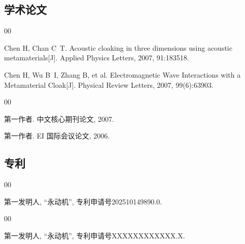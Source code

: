 ﻿%

\begin{achievements}

\subsection*{学术论文}

\begin{bibliolist}{00}
  \item Chen H, Chan C~T. Acoustic cloaking in three dimensions using acoustic metamaterials[J]. Applied Physics Letters, 2007, 91:183518.
  \item Chen H, Wu B~I, Zhang B, et al. Electromagnetic Wave Interactions with a Metamaterial Cloak[J]. Physical Review Letters, 2007, 99(6):63903.
\end{bibliolist}

\begin{bibliolist*}{00}
  \item 第一作者. 中文核心期刊论文, 2007.
  \item 第一作者. EI 国际会议论文, 2006.
\end{bibliolist*}

\subsection*{专利}

\begin{bibliolist}{00}
  \item 第一发明人, “永动机”, 专利申请号202510149890.0.
\end{bibliolist}

\begin{bibliolist*}{00}
  \item 第一发明人, “永动机”, 专利申请号XXXXXXXXXXXX.X.
\end{bibliolist*}

\end{achievements}
